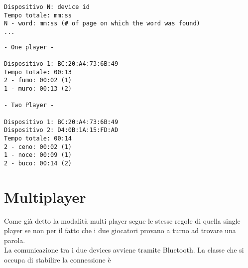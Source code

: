 \begin{lstlisting}[float, caption=Struttura delle satistiche inviate, label=lst:stats]
Dispositivo N: device id
Tempo totale: mm:ss
N - word: mm:ss (# of page on which the word was found)
...
\end{lstlisting}


\begin{lstlisting}[float, caption=Esempio di statistiche, label=lst:stats_example]
- One player -

Dispositivo 1: BC:20:A4:73:6B:49
Tempo totale: 00:13
2 - fumo: 00:02 (1)
1 - muro: 00:13 (2)

- Two Player -

Dispositivo 1: BC:20:A4:73:6B:49
Dispositivo 2: D4:0B:1A:15:FD:AD
Tempo totale: 00:14
2 - ceno: 00:02 (1)
1 - noce: 00:09 (1)
2 - buco: 00:14 (2)
\end{lstlisting}

\section{Multiplayer}
\label{sec:multi_player}
Come già detto la modalità multi player segue le stesse regole di quella single player se non per il fatto che i due giocatori provano a turno ad trovare una parola.\\
La comunicazione tra i due devices avviene tramite Bluetooth. La classe che si occupa di stabilire la connessione è 



